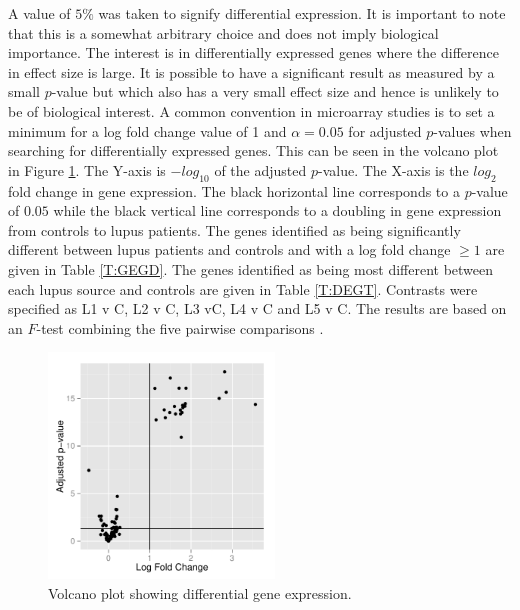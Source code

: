 \documentclass[a4paper, 12pt]{report}
\begin{document}
A value of $5\%$ was taken to signify differential expression. It is important to note that this is a somewhat arbitrary choice and does not imply biological importance. The interest is in differentially expressed genes where the difference in effect size is large. It is possible to have a significant result as measured by a small $p$-value but which also has a very small effect size and hence is unlikely to be of biological interest. A common convention in microarray studies is to set a minimum for a log fold change value of 1 and  $\alpha = 0.05$ for adjusted $p$-values when searching for differentially expressed genes. This can be seen in the volcano plot in Figure \ref{F:volcano}. The Y-axis is $-log_{10}$ of the adjusted $p$-value. The X-axis is the $log_2$ fold change in gene expression. The black horizontal line corresponds to a $p$-value of $0.05$ while the black vertical line corresponds to a doubling in gene expression from controls to lupus patients. The genes identified as being significantly different between lupus patients and controls and with a log fold change $\ge 1$ are given in Table \ref{T:GEGD}. The genes identified as being most different between each lupus source and controls are given in Table \ref{T:DEGT}. Contrasts were specified as L1 v C, L2 v C, L3 vC, L4 v C and L5 v C. The results are based on an $F$-test combining the five pairwise comparisons \cite{limma}.

\begin{figure}[H]
\begin{centering}
\includegraphics[width=6cm]{volcano.pdf}
\caption{Volcano plot showing differential gene expression.}
\label{F:volcano}
\end{centering}
\end{figure}
\end{document}
